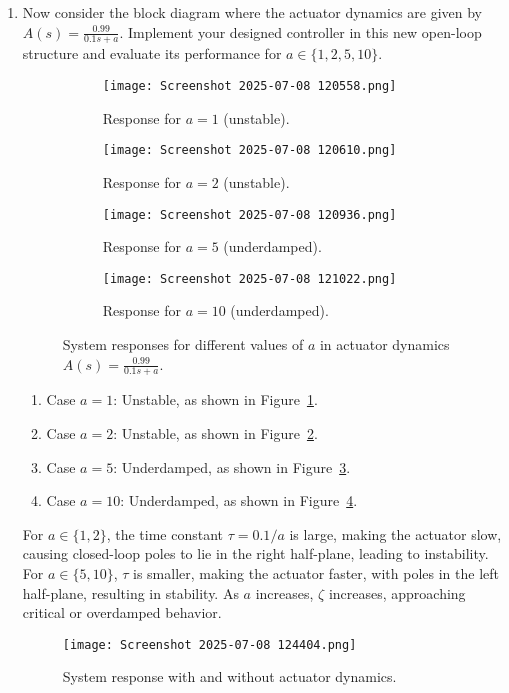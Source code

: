 \documentclass{article}
\begin{document}
\begin{enumerate}
  \item Now consider the block diagram where the actuator dynamics are given by $A(s)=\frac{0.99}{0.1s+a}$. Implement your designed controller in this new open-loop structure and evaluate its performance for $a \in \{1,2,5,10\}$.
  \begin{figure}[h!]
    \centering
    \begin{subfigure}[b]{0.48\textwidth}
      \centering
      \texttt{[image: Screenshot 2025-07-08 120558.png]}
      \caption{Response for $a=1$ (unstable).}
      \label{fig:actuator_a1}
    \end{subfigure}
    \hfill
    \begin{subfigure}[b]{0.48\textwidth}
      \centering
      \texttt{[image: Screenshot 2025-07-08 120610.png]}
      \caption{Response for $a=2$ (unstable).}
      \label{fig:actuator_a2}
    \end{subfigure}

    \vspace{0.5em}

    \begin{subfigure}[b]{0.48\textwidth}
      \centering
      \texttt{[image: Screenshot 2025-07-08 120936.png]}
      \caption{Response for $a=5$ (underdamped).}
      \label{fig:actuator_a5}
    \end{subfigure}
    \hfill
    \begin{subfigure}[b]{0.48\textwidth}
      \centering
      \texttt{[image: Screenshot 2025-07-08 121022.png]}
      \caption{Response for $a=10$ (underdamped).}
      \label{fig:actuator_a10}
    \end{subfigure}
    \caption{System responses for different values of $a$ in actuator dynamics $A(s)=\frac{0.99}{0.1s+a}$.}
    \label{fig:actuator_responses}
  \end{figure}
  \begin{enumerate}
    \item Case $a=1$: Unstable, as shown in Figure~\ref{fig:actuator_a1}.
    \item Case $a=2$: Unstable, as shown in Figure~\ref{fig:actuator_a2}.
    \item Case $a=5$: Underdamped, as shown in Figure~\ref{fig:actuator_a5}.
    \item Case $a=10$: Underdamped, as shown in Figure~\ref{fig:actuator_a10}.
  \end{enumerate}
  For $a \in \{1,2\}$, the time constant $\tau = 0.1/a$ is large, making the actuator slow, causing closed-loop poles to lie in the right half-plane, leading to instability. For $a \in \{5,10\}$, $\tau$ is smaller, making the actuator faster, with poles in the left half-plane, resulting in stability. As $a$ increases, $\zeta$ increases, approaching critical or overdamped behavior.
  \begin{figure}[h!]
    \centering
    \texttt{[image: Screenshot 2025-07-08 124404.png]}
    \caption{System response with and without actuator dynamics.}
    \label{fig:actuator_comparison}
  \end{figure}
\end{enumerate}
\end{document}
